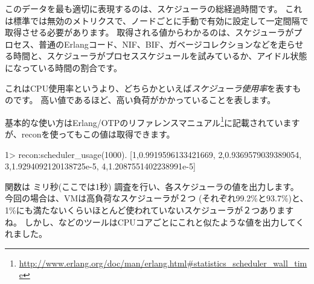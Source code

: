 このデータを最も適切に表現するのは、スケジューラの総経過時間です。 
これは標準では無効のメトリクスで、ノードごとに手動で有効に設定して一定間隔で取得させる必要があります。
取得される値からわかるのは、スケジューラがプロセス、普通のErlangコード、NIF、BIF、ガベージコレクションなどを走らせる時間と、スケジューラがプロセススケジュールを試みているか、アイドル状態になっている時間の割合です。

これはCPU使用率というより、どちらかといえば\emph{スケジューラ使用率}を表すものです。
高い値であるほど、高い負荷がかかっていることを表します。

基本的な使い方はErlang/OTPのリファレンスマニュアル\footnote{\href{http://www.erlang.org/doc/man/erlang.html\#statistics\_scheduler\_wall\_time}{http://www.erlang.org/doc/man/erlang.html\#statistics\_scheduler\_wall\_time}}に記載されていますが、reconを使ってもこの値は取得できます。

\begin{VerbatimEshell}
1> recon:scheduler_usage(1000).
[{1,0.9919596133421669},
 {2,0.9369579039389054},
 {3,1.9294092120138725e-5},
 {4,1.2087551402238991e-5}]
\end{VerbatimEshell}

関数は ミリ秒(ここでは1秒) 調査を行い、各スケジューラの値を出力します。
今回の場合は、VMは高負荷なスケジューラが２つ (それぞれ99.2\%と93.7\%)と、1\%にも満たないくらいほとんど使われていないスケジューラが２つありますね。
しかし、などのツールはCPUコアごとにこれと似たような値を出力してくれました。 

